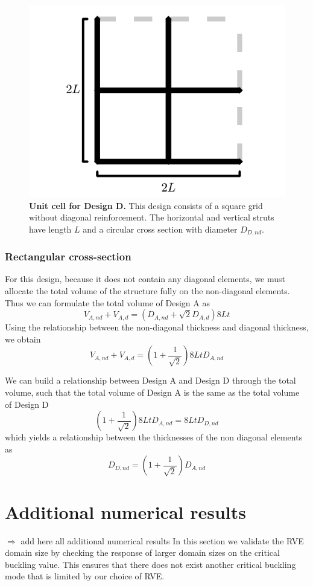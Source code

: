 \documentclass[10pt,twoside]{fernandes_supp}
\newcommand{\KB}[1]{\noindent\color{blue}$\Longrightarrow$ #1\normalcolor}
\begin{document}
\begin{figure}[H]
    \centering
    \includegraphics[width=0.45\linewidth]{SFig5.png}
    \caption{{\bf Unit cell for Design D.} This design consists of a square grid without diagonal reinforcement.  The horizontal and vertical struts have length $L$ and a circular cross section with diameter $D_{D,nd}$.}
    \label{DesignD}
\end{figure}

\subsubsection{Rectangular cross-section}
For this design, because it does not contain any diagonal elements, we must allocate the total volume of the structure fully on the non-diagonal elements. Thus we can formulate the total volume of Design A as
\begin{equation}
	V_{A,nd}+V_{A,d}=(D_{A,nd}+\sqrt{2}D_{A,d})8Lt
\end{equation}
Using the relationship between the non-diagonal thickness and diagonal thickness, we obtain
\begin{equation}
V_{A,nd}+V_{A,d}=\left(1+\frac{1}{\sqrt{2}}\right)8LtD_{A,nd}
\end{equation}

We can build a relationship between Design A and Design D through the total volume, such that the total volume of Design A is the same as the total volume of Design D
\begin{equation}
\left(1+\frac{1}{\sqrt{2}}\right)8LtD_{A,nd}=8LtD_{D,nd}
\end{equation}
which yields a relationship between the thicknesses of the non diagonal elements as
\begin{equation}
	D_{D,nd}=\left(1+\frac{1}{\sqrt{2}}\right)D_{A,nd}
\end{equation}

\section{Additional numerical results}
\KB{add here all additional numerical results}
In this section we validate the RVE domain size by checking the response of larger domain sizes on the critical buckling value. This ensures that there does not exist another critical buckling mode that is limited by our choice of RVE.  
\end{document}

